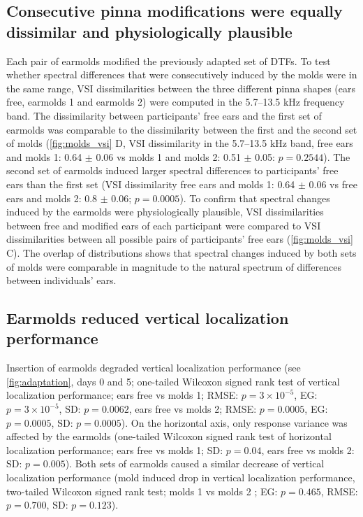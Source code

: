 \subsection{Consecutive pinna modifications were equally dissimilar and physiologically plausible}

Each pair of earmolds modified the previously adapted set of DTFs. To test whether spectral differences that were consecutively induced by the molds were in the same range, VSI dissimilarities between the three different pinna shapes (ears free, earmolds 1 and earmolds 2) were computed in the 5.7–13.5 kHz frequency band. The dissimilarity between participants' free ears and the first set of earmolds was comparable to the dissimilarity between the first and the second set of molds (\cref{fig:molds_vsi} D, VSI dissimilarity in the 5.7–13.5 kHz band, free ears and molds 1:  0.64 $\pm$ 0.06 vs molds 1 and molds 2:  0.51 $\pm$ 0.05: $p = 0.2544$). The second set of earmolds induced larger spectral differences to participants' free ears than the first set (VSI dissimilarity free ears and molds 1:  0.64 $\pm$ 0.06 vs free ears and molds 2: 0.8 $\pm$ 0.06; $p = 0.0005$). To confirm that spectral changes induced by the earmolds were physiologically plausible, VSI dissimilarities between free and modified ears of each participant were compared to VSI dissimilarities between all possible pairs of participants’ free ears (\cref{fig:molds_vsi} C). The overlap of distributions shows that spectral changes induced by both sets of molds were comparable in magnitude to the natural spectrum of differences between individuals’ ears.

\subsection{Earmolds reduced vertical localization performance}

Insertion of earmolds degraded vertical localization performance (see \cref{fig:adaptation}, days 0 and 5; one-tailed Wilcoxon signed rank test of vertical localization performance; ears free vs molds 1; RMSE: $p = 3  \times 10^{-5}$, EG: $p = 3 \times 10^{-5}$, SD: $p = 0.0062$, ears free vs molds 2; RMSE: $p = 0.0005$, EG: $p = 0.0005$, SD: $p = 0.0005$). On the horizontal axis, only response variance was affected by the earmolds (one-tailed Wilcoxon signed rank test of horizontal localization performance; ears free vs molds 1; SD: $p = 0.04$, ears free vs molds 2: SD: $p = 0.005$). Both sets of earmolds caused a similar decrease of vertical localization performance (mold induced drop in vertical localization performance, two-tailed Wilcoxon signed rank test; molds 1 vs molds 2 ; EG: $p = 0.465$, RMSE: $p = 0.700$, SD: $p = 0.123$).


